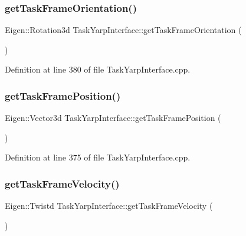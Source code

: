 \subsubsection{\texorpdfstring{get\+Task\+Frame\+Orientation()}{getTaskFrameOrientation()}}
{\footnotesize\ttfamily Eigen\+::\+Rotation3d Task\+Yarp\+Interface\+::get\+Task\+Frame\+Orientation (\begin{DoxyParamCaption}{ }\end{DoxyParamCaption})}



Definition at line 380 of file Task\+Yarp\+Interface.\+cpp.

\hypertarget{classocra_1_1TaskYarpInterface_a5bdab48cc56cd473f007bb6f1c9c739d}{}\label{classocra_1_1TaskYarpInterface_a5bdab48cc56cd473f007bb6f1c9c739d} 
\subsubsection{\texorpdfstring{get\+Task\+Frame\+Position()}{getTaskFramePosition()}}
{\footnotesize\ttfamily Eigen\+::\+Vector3d Task\+Yarp\+Interface\+::get\+Task\+Frame\+Position (\begin{DoxyParamCaption}{ }\end{DoxyParamCaption})}



Definition at line 375 of file Task\+Yarp\+Interface.\+cpp.

\hypertarget{classocra_1_1TaskYarpInterface_a073e124334125ce712c194a5e6826038}{}\label{classocra_1_1TaskYarpInterface_a073e124334125ce712c194a5e6826038} 
\subsubsection{\texorpdfstring{get\+Task\+Frame\+Velocity()}{getTaskFrameVelocity()}}
{\footnotesize\ttfamily Eigen\+::\+Twistd Task\+Yarp\+Interface\+::get\+Task\+Frame\+Velocity (\begin{DoxyParamCaption}{ }\end{DoxyParamCaption})}



